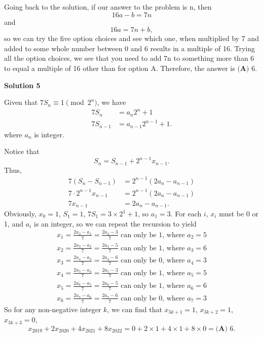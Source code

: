 \begin{enumerate}
 Going back to the solution, if our answer to the problem is n, then 
 \[16a - b = 7n\] and 
 \[16a = 7n + b,\] so we can try the five option choices and see which one, when multiplied by 7 and added to some whole number between 0 and 6 results in a multiple of 16. Trying all the option choices, we see that you need to add 7n to something more than 6 to equal a multiple of 16 other than for option A. Therefore, the answer is $\boxed{\textbf{(A) } 6}.$




\textbf{Solution 5}

Given that $7S_n \equiv 1 \pmod{2^n}$, we have
 \begin{align*} 7S_n &= a_n2^n + 1\\ 7S_{n-1} &= a_{n-1}2^{n-1} + 1. \end{align*}
where $a_n$ is integer.

 Notice that 
 \[S_n = S_{n-1} + 2^{n-1}x_{n-1}.\]Thus,
 \begin{align*} 7(S_n - S_{n-1}) &= 2^{n-1}(2a_n - a_{n-1})\\ 7 \cdot 2^{n - 1}x_{n - 1} &= 2^{n - 1}(2a_n - a_{n - 1})\\ 7x_{n-1} &= 2a_n - a_{n-1}. \end{align*}
Obviously, $x_0 = 1$, $S_1 = 1$, $7S_1 = 3 \times 2^1 + 1$, so $a_1 = 3$. For each $i$, $x_i$ must be 0 or 1, and $a_i$ is an integer, so we can repeat the recursion to yield
 \begin{align*} x_1 = \frac{2a_2 - a_1}{7} = \frac{2a_2 - 3}{7}\text{ can only be 1, where }a_2 = 5\\ x_2 = \frac{2a_3 - a_2}{7} = \frac{2a_3 - 5}{7}\text{ can only be 1, where }a_3 = 6\\ x_3 = \frac{2a_4 - a_3}{7} = \frac{2a_4 - 6}{7}\text{ can only be 0, where }a_4 = 3\\ x_4 = \frac{2a_5 - a_4}{7} = \frac{2a_5 - 3}{7}\text{ can only be 1, where }a_5 = 5\\ x_5 = \frac{2a_6 - a_5}{7} = \frac{2a_6 - 5}{7}\text{ can only be 1, where }a_6 = 6\\ x_6 = \frac{2a_7 - a_6}{7} = \frac{2a_7 - 6}{7}\text{ can only be 0, where }a_7 = 3 \end{align*}
So for any non-negative integer $k$,  we can find that $x_{3k + 1} = 1$, $x_{3k + 2} = 1$, $x_{3k + 3} = 0$, 
 \[x_{2019} + 2x_{2020} + 4x_{2021} + 8x_{2022} = 0 + 2 \times 1 + 4 \times 1 + 8 \times  0 = \boxed{\textbf{(A) } 6}.\]





\end{enumerate}
